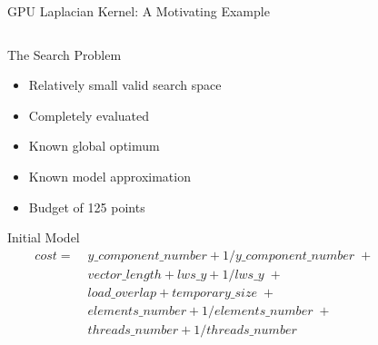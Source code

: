 \documentclass[10pt, compress, aspectratio=169, xcolor={table,usenames,dvipsnames}]{beamer}
\begin{document}
\begin{frame}[label={sec:orgba4181b}]{GPU Laplacian Kernel: A Motivating Example}
\begin{columns}
\begin{column}{0.5\columnwidth}
\begin{block}{The Search Problem}
\begin{itemize}
\item Relatively \alert{small valid search space}
\item \alert{Completely evaluated}
\item Known \alert{global optimum}
\item Known \alert{model approximation}
\item \alert{Budget} of \alert{125 points}
\end{itemize}

\begin{block}{Initial Model}
\footnotesize
\begin{align*}
cost = & \; y\_component\_number + 1 / y\_component\_number \; + \\
& \; vector\_length + lws\_y + 1 / lws\_y \; + \\
& \; load\_overlap + temporary\_size \; + \\
& \; elements\_number + 1 / elements\_number \; + \\
& \; threads\_number + 1 / threads\_number
\end{align*}
\normalsize
\end{block}
\end{block}
\end{column}

\begin{column}{0.5\columnwidth}
\vspace{-.3cm}


\end{column}
\end{columns}
\end{frame}
\end{document}
